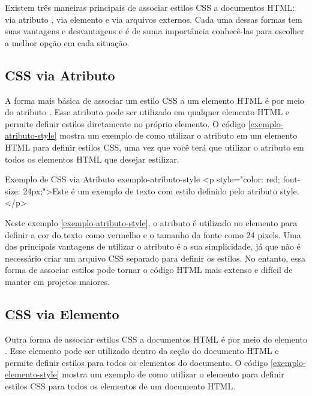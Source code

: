 Existem três maneiras principais de associar estilos CSS a documentos HTML: via atributo , via elemento  e via arquivos externos. Cada uma dessas formas tem suas vantagens e desvantagens e é de suma importância conhecê-las para escolher a melhor opção em cada situação.

\subsection{CSS via Atributo }

A forma mais básica de associar um estilo CSS a um elemento HTML é por meio do atributo . Esse atributo pode ser utilizado em qualquer elemento HTML e permite definir estilos diretamente no próprio elemento. O código \ref{exemplo-atributo-style} mostra um exemplo de como utilizar o atributo  em um elemento HTML para definir estilos CSS, uma vez que você terá que utilizar o atributo  em todos os elementos HTML que desejar estilizar.

\begin{htmlcode}{Exemplo de CSS via Atributo }{exemplo-atributo-style}
<p style="color: red; font-size: 24px;">Este é um exemplo 
    de texto com estilo definido pelo atributo style.</p>
\end{htmlcode}

Neste exemplo \ref{exemplo-atributo-style}, o atributo  é utilizado no elemento  para definir a cor do texto como vermelho e o tamanho da fonte como 24 pixels. Uma das principais vantagens de utilizar o atributo  é a sua simplicidade, já que não é necessário criar um arquivo CSS separado para definir os estilos. No entanto, essa forma de associar estilos pode tornar o código HTML mais extenso e difícil de manter em projetos maiores.

\subsection{CSS via Elemento }

Outra forma de associar estilos CSS a documentos HTML é por meio do elemento . Esse elemento pode ser utilizado dentro da seção  do documento HTML e permite definir estilos para todos os elementos do documento. O código \ref{exemplo-elemento-style} mostra um exemplo de como utilizar o elemento  para definir estilos CSS para todos os elementos  de um documento HTML.

